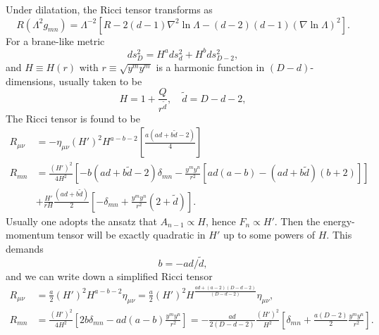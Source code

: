 Under dilatation, the Ricci tensor transforms as
\begin{equation}
R(\Lambda^2 g_{mn})
=\Lambda^{-2}[R-2(d-1)\nabla^2\ln\Lambda - (d-2)(d-1)(\nabla \ln \Lambda)^2].
\end{equation}
For a brane-like metric
\begin{equation}
ds_D^2 = H^{a}ds_{d}^2 + H^bds_{D-2}^2,
\end{equation}
and $H\equiv H(r)$ with $r\equiv \sqrt{y^my^m}$ is a harmonic function in $(D-d)$-dimensions, usually taken to be
\begin{equation}
H = 1 + \frac{Q}{r^{\tilde{d}}},\quad \tilde{d} = D-d-2,
\end{equation}
The Ricci tensor is found to be
\begin{equation}
\begin{aligned}
R_{\mu\nu}
&=-\eta_{\mu\nu}(H')^2H^{a-b-2}\left[\frac{a(ad+b\tilde d-2)}{4}\right]\\
R_{mn} 
&= \frac{(H')^2}{4H^2}\left[-b(ad+b\tilde{d}-2)\delta_{mn}-\frac{y^m y^n}{r^2}\left[ad(a-b)-(ad+b\tilde{d})(b+2)\right]\right]\\
&+\frac{H'}{rH}\frac{(ad+b\tilde{d})}{2}\left[-\delta_{mn} + \frac{y^m y^n}{r^2}(2+\tilde{d})\right].
\end{aligned}
\end{equation}
Usually one adopts the ansatz that $A_{n-1} \propto H$, hence $F_n \propto H'$.
Then the energy-momentum tensor will be exactly quadratic in $H'$ up to some powers of $H$.
This demands
\begin{equation}
b=-ad/\tilde{d},
\end{equation}
and we can write down a simplified Ricci tensor
\begin{equation}
\begin{aligned}
R_{\mu\nu} 
&= \frac{a}{2}(H')^2H^{a-b-2} \eta_{\mu\nu}
=\frac{a}{2}(H')^2H^{\frac{ad+(a-2)(D-d-2)}{(D-d-2)}} \eta_{\mu\nu},\\
R_{mn}
&=\frac{(H')^2}{4H^2}\left[2b\delta_{mn}-ad(a-b)\frac{y^my^n}{r^2}\right]
=-\frac{ad}{2(D-d-2)}\frac{(H')^2}{H^2}\left[
\delta_{mn}+\frac{a(D-2)}{2}\frac{y^m y^n}{r^2}
\right].
\end{aligned}
\end{equation}
